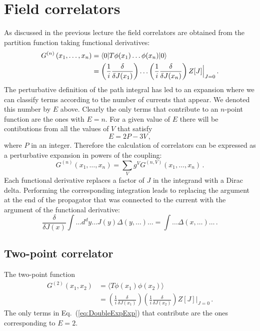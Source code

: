 \newcommand{\tphi}{\tilde{\phi}}
\newcommand{\tj}{\tilde{J}}
\newcommand{\tchi}{\tilde{\chi}}

\section{Field correlators}
\label{sec:field-correlators}

As discussed in the previous lecture the field correlators are
obtained from the partition function taking functional derivatives: 
\begin{align}
  \label{eq:CorrDefnPts}
  G^{(n)}\left(x_1, \ldots, x_n\right) 
  &=
    \langle 0 | T \phi(x_1) \ldots \phi(x_n) | 0 \rangle  \\
  \label{eq:CorrDerivGen}
  &= 
    \left(\frac{1}{i} \frac{\delta}{\delta J(x_1)}\right)
    \ldots
    \left(\frac{1}{i} \frac{\delta}{\delta J(x_n)}\right)
    Z[J]\Big|_{J=0} \, .
\end{align}
The perturbative definition of the path integral has led to an
expansion where we can classify terms according to the number of
currents that appear. We denoted this number by $E$ above. Clearly the
only terms that contribute to an $n$-point function are the ones with
$E=n$. For a given value of $E$ there will be contibutions from all
the values of $V$ that satisfy
\[
  E =2P- 3V\, ,
\]
where $P$ in an integer. Therefore the calculation of correlators can
be expressed as a perturbative expansion in powers of the coupling:
\begin{equation}
  \label{eq:CorrPertTh}
  G^{(n)}\left(x_1, \ldots, x_n\right) = 
  \sum_V g^V G^{(n,V)} \left(x_1, \ldots, x_n\right) \, .
\end{equation}
Each functional derivative replaces a factor
of $J$ in the integrand with a Dirac delta. Performing the
corresponding integration leads to replacing the argument at the end
of the propagator that was connected to the current with the argument
of the functional derivative:
\begin{equation}
  \label{eq:DeltaReplace}
  \frac{\delta}{\delta J(x)} \int \ldots d^dy \ldots J(y) \Delta(y,
  \ldots) \ldots =  \int \ldots \Delta(x,\ldots) \ldots\, .
\end{equation}

\subsection{Two-point correlator}
\label{sec:two-point-correlator}

 The two-point function
\begin{align}
  \label{eq:TwoPtOne}
  G^{(2)}(x_1,x_2) 
  &= 
    \langle T \phi(x_1) \phi(x_2) \rangle \\
  &= 
    \left(\frac{1}{i} \frac{\delta}{\delta J(x_1)}\right)
    \left(\frac{1}{i} \frac{\delta}{\delta J(x_2)}\right)
    Z[J]\Big|_{J=0} \, .
\end{align}
The only terms in Eq.~(\ref{eq:DoubleExpExp}) that contribute are the
ones corresponding to $E=2$. 

